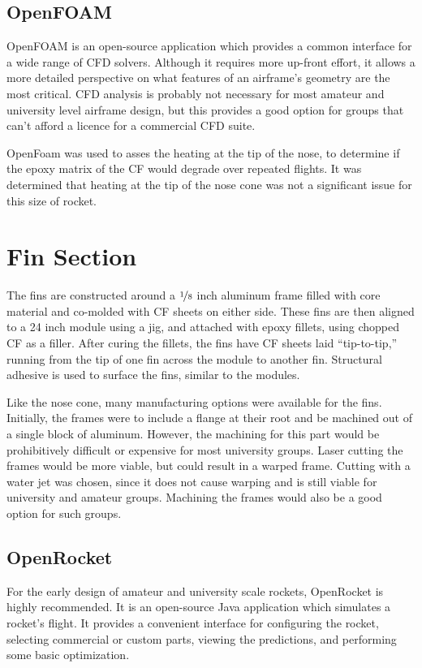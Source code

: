 \documentclass{aiaa-tc}%
\begin{document}
\subsection{OpenFOAM}
OpenFOAM is an open-source application which provides a common interface for a wide range of CFD solvers.
Although it requires more up-front effort, it allows a more detailed perspective on what features of an airframe's geometry are the most critical. 
CFD analysis is probably not necessary for most amateur and university level airframe design, but this provides a good option for groups that can't afford a licence for a commercial CFD suite. 

OpenFoam was used to asses the heating at the tip of the nose, to determine if the epoxy matrix of the CF would degrade over repeated flights.
It was determined that heating at the tip of the nose cone was not a significant issue for this size of rocket.

\section{Fin Section}

The fins are constructed around a $\nicefrac{1}{8}$ inch aluminum frame filled with core material and co-molded with CF sheets on either side. 
These fins are then aligned to a 24 inch module using a jig, and attached with epoxy fillets, using chopped CF as a filler. 
After curing the fillets, the fins have CF sheets laid ``tip-to-tip,'' running from the tip of one fin across the module to another fin. 
Structural adhesive is used to surface the fins, similar to the modules. 

Like the nose cone, many manufacturing options were available for the fins. 
Initially, the frames were to include a flange at their root and be machined out of a single block of aluminum. 
However, the machining for this part would be prohibitively difficult or expensive for most university groups. 
Laser cutting the frames would be more viable, but could result in a warped frame.
Cutting with a water jet was chosen, since it does not cause warping and is still viable for university and amateur groups. 
Machining the frames would also be a good option for such groups. 

\subsection{OpenRocket}
For the early design of amateur and university scale rockets, OpenRocket\cite{OR} is highly recommended. 
It is an open-source Java application which simulates a rocket's flight. It provides a convenient interface for configuring the rocket, selecting commercial or custom parts, viewing the predictions, and performing some basic optimization. 
\end{document}
